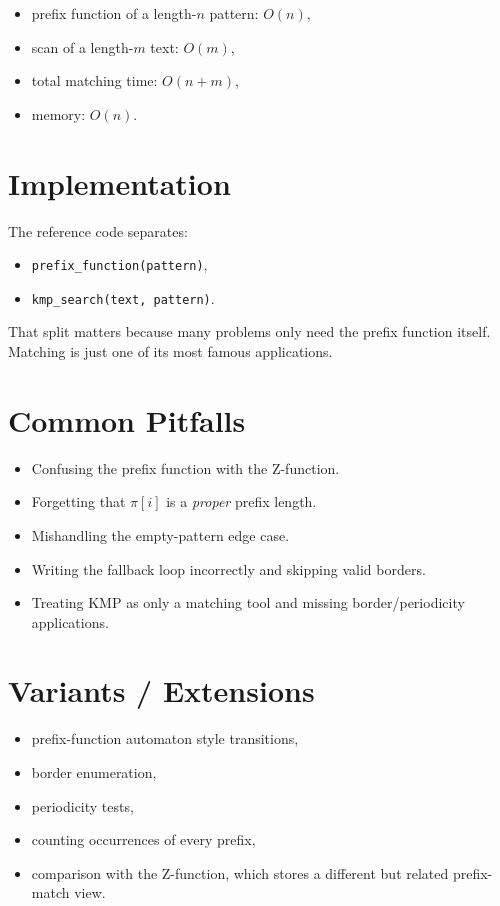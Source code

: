\begin{itemize}
  \item prefix function of a length-\(n\) pattern: \(O(n)\),
  \item scan of a length-\(m\) text: \(O(m)\),
  \item total matching time: \(O(n + m)\),
  \item memory: \(O(n)\).
\end{itemize}

\section*{Implementation}

The reference code separates:

\begin{itemize}
  \item \texttt{prefix\_function(pattern)},
  \item \texttt{kmp\_search(text, pattern)}.
\end{itemize}

That split matters because many problems only need the prefix function itself. Matching is just one of its most famous
applications.

\section*{Common Pitfalls}

\begin{itemize}
  \item Confusing the prefix function with the Z-function.
  \item Forgetting that \(\pi[i]\) is a \emph{proper} prefix length.
  \item Mishandling the empty-pattern edge case.
  \item Writing the fallback loop incorrectly and skipping valid borders.
  \item Treating KMP as only a matching tool and missing border/periodicity applications.
\end{itemize}

\section*{Variants / Extensions}

\begin{itemize}
  \item prefix-function automaton style transitions,
  \item border enumeration,
  \item periodicity tests,
  \item counting occurrences of every prefix,
  \item comparison with the Z-function, which stores a different but related prefix-match view.
\end{itemize}

